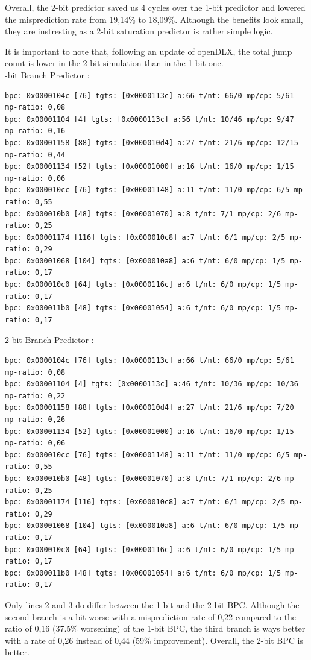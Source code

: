\documentclass[a4paper]{report}
\begin{document}
Overall, the 2-bit predictor saved us 4 cycles over the 1-bit predictor and lowered the misprediction rate
from 19,14\% to 18,09\%. Although the benefits look small, they are instresting as a 2-bit saturation
predictor is rather simple logic.

It is important to note that, following an update of openDLX, the total jump count is lower in the 2-bit
simulation than in the 1-bit one.
\mbox{}\\

-bit Branch Predictor :
\begin{verbatim}
bpc: 0x0000104c [76] tgts: [0x0000113c] a:66 t/nt: 66/0 mp/cp: 5/61 mp-ratio: 0,08
bpc: 0x00001104 [4] tgts: [0x0000113c] a:56 t/nt: 10/46 mp/cp: 9/47 mp-ratio: 0,16
bpc: 0x00001158 [88] tgts: [0x000010d4] a:27 t/nt: 21/6 mp/cp: 12/15 mp-ratio: 0,44
bpc: 0x00001134 [52] tgts: [0x00001000] a:16 t/nt: 16/0 mp/cp: 1/15 mp-ratio: 0,06
bpc: 0x000010cc [76] tgts: [0x00001148] a:11 t/nt: 11/0 mp/cp: 6/5 mp-ratio: 0,55
bpc: 0x000010b0 [48] tgts: [0x00001070] a:8 t/nt: 7/1 mp/cp: 2/6 mp-ratio: 0,25
bpc: 0x00001174 [116] tgts: [0x000010c8] a:7 t/nt: 6/1 mp/cp: 2/5 mp-ratio: 0,29
bpc: 0x00001068 [104] tgts: [0x000010a8] a:6 t/nt: 6/0 mp/cp: 1/5 mp-ratio: 0,17
bpc: 0x000010c0 [64] tgts: [0x0000116c] a:6 t/nt: 6/0 mp/cp: 1/5 mp-ratio: 0,17
bpc: 0x000011b0 [48] tgts: [0x00001054] a:6 t/nt: 6/0 mp/cp: 1/5 mp-ratio: 0,17
\end{verbatim}
2-bit Branch Predictor :
\begin{verbatim}
bpc: 0x0000104c [76] tgts: [0x0000113c] a:66 t/nt: 66/0 mp/cp: 5/61 mp-ratio: 0,08
bpc: 0x00001104 [4] tgts: [0x0000113c] a:46 t/nt: 10/36 mp/cp: 10/36 mp-ratio: 0,22
bpc: 0x00001158 [88] tgts: [0x000010d4] a:27 t/nt: 21/6 mp/cp: 7/20 mp-ratio: 0,26
bpc: 0x00001134 [52] tgts: [0x00001000] a:16 t/nt: 16/0 mp/cp: 1/15 mp-ratio: 0,06
bpc: 0x000010cc [76] tgts: [0x00001148] a:11 t/nt: 11/0 mp/cp: 6/5 mp-ratio: 0,55
bpc: 0x000010b0 [48] tgts: [0x00001070] a:8 t/nt: 7/1 mp/cp: 2/6 mp-ratio: 0,25
bpc: 0x00001174 [116] tgts: [0x000010c8] a:7 t/nt: 6/1 mp/cp: 2/5 mp-ratio: 0,29
bpc: 0x00001068 [104] tgts: [0x000010a8] a:6 t/nt: 6/0 mp/cp: 1/5 mp-ratio: 0,17
bpc: 0x000010c0 [64] tgts: [0x0000116c] a:6 t/nt: 6/0 mp/cp: 1/5 mp-ratio: 0,17
bpc: 0x000011b0 [48] tgts: [0x00001054] a:6 t/nt: 6/0 mp/cp: 1/5 mp-ratio: 0,17
\end{verbatim}

Only lines 2 and 3 do differ between the 1-bit and the 2-bit BPC. Although the second branch is a bit worse
with a misprediction rate of 0,22 compared to the ratio of 0,16 (37.5\% worsening) of the 1-bit BPC, the third
branch is ways better with a rate of 0,26 instead of 0,44 (59\% improvement). Overall, the 2-bit BPC is
better.
\end{document}
